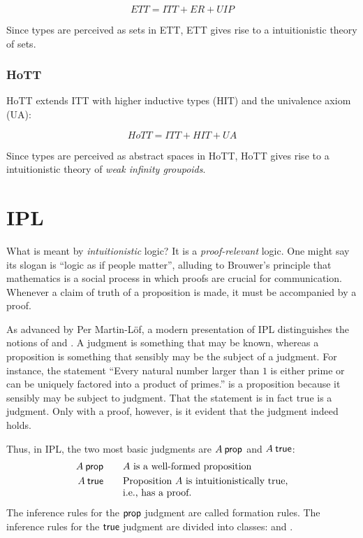 \documentclass[12pt]{article}
\begin{document}
\begin{equation*}
ETT = ITT + ER + UIP
\end{equation*}

\noindent Since types are perceived as sets in \acs{ETT}, \acs{ETT} gives rise to a
intuitionistic theory of sets.

\subsubsection{\Acl{HoTT}}

\Acs{HoTT} extends \acs{ITT} with higher inductive types (HIT) and the univalence axiom (UA):


\begin{equation*}
HoTT = ITT + HIT + UA
\end{equation*}

\noindent Since types are perceived as abstract spaces in \acs{HoTT}, \acs{HoTT} gives rise to
a intuitionistic theory of \emph{weak infinity groupoids}.

\section{\Acl{IPL}}\label{sec:ipl}

What is meant by \emph{intuitionistic} logic?  It is a \emph{proof-relevant}
logic.  One might say its slogan is ``logic as if people matter'', alluding to
Brouwer's principle that mathematics is a social process in which proofs are
crucial for communication.  Whenever a claim of truth of a proposition is made,
it must be accompanied by a proof.

As advanced by Per Martin-L\"{o}f, a modern presentation of \acf{IPL} distinguishes the notions of  and .
A judgment is something that may be known, whereas a proposition is something that sensibly may be the subject of a judgment.
For instance, the statement ``Every natural number larger than $1$ is either prime or can be uniquely factored into a product of primes\@.'' is a proposition because it sensibly may be subject to judgment.
That the statement is in fact true is a judgment.
Only with a proof, however, is it evident that the judgment indeed holds.

Thus, in \ac{IPL}, the two most basic judgments are $A \prop$ and $A \true$:
\begin{alignat*}{2}
  A \prop &&\quad& \text{$A$ is a well-formed proposition} \\
  A \true &&& \text{\begin{tabular}[t]{@{}l@{}}
                Proposition $A$ is intuitionistically true, \\
                i.e., has a proof.
              \end{tabular}}
\end{alignat*}
The inference rules for the $\prop$ judgment are called formation rules.
The inference rules for the $\true$ judgment are divided into classes:   and .
\end{document}
